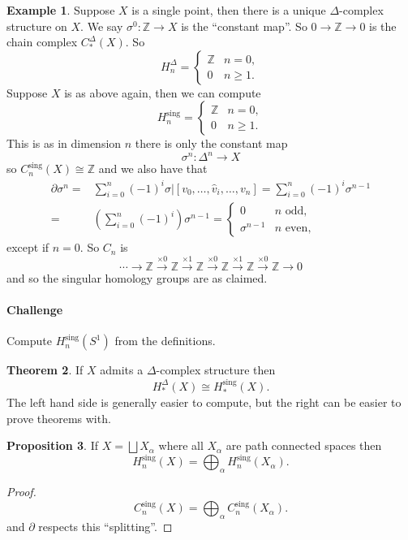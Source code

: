\documentclass[12pt]{article}
\theoremstyle{definition}
\newtheorem{thm}{Theorem}[subsection]
\newtheorem{prop}[thm]{Proposition}
\theoremstyle{definition}
\newtheorem{ex}[thm]{Example}
\newcommand{\ZZ}{\mathbb{Z}}
\newcommand{\C}{C_*}
\renewcommand{\H}{H_*}
\begin{document}
\begin{ex}
Suppose $X$ is a single point, then there is a unique $\Delta$-complex structure on $X$.
We say $\sigma^0\colon \ZZ \to X$ is the ``constant map''.
So $0 \to \ZZ \to 0$ is the chain complex $\C^\Delta(X)$.
So
\[
H_n^\Delta =\begin{cases}\ZZ &n=0,\\
0 &n\ge 1.
\end{cases} 
\]
Suppose $X$ is as above again, then we can compute
\[
H_n^\text{sing} =\begin{cases}\ZZ &n=0,\\
0 &n\ge 1.
\end{cases}
\]
This is as in dimension $n$ there is only the constant map
\[
\sigma^n \colon \Delta^n \to X
\]
so $C_n^\text{sing}(X) \cong \ZZ$ and we also have that
\begin{align*}
\partial \sigma^n =& \sum_{i=0}^{n} (-1)^i \sigma|[v_0,\ldots,\hat v_i,\ldots,v_n] = \sum_{i=0}^{n} (-1)^i \sigma^{n-1}\\
=& \left(\sum_{i=0}^{n} (-1)^i\right)\sigma^{n-1} =\begin{cases}
0 &n\text{ odd},\\
\sigma^{n-1} &n\text{ even},
\end{cases}
\end{align*}
except if $n=0$.
So $C_n$ is 
\[
\cdots\to \ZZ \xrightarrow{\times 0}\ZZ \xrightarrow{\times 1}\ZZ \xrightarrow{\times 0}\ZZ \xrightarrow{\times 1}\ZZ \xrightarrow{\times 0}\ZZ \to 0
\]
and so the singular homology groups are as claimed.
\end{ex}

\paragraph{Challenge} Compute $H_n^\text{sing}(S^1)$ from the definitions.

\begin{thm}
If $X$ admits a $\Delta$-complex structure then 
\[
\H^\Delta(X) \cong \H^\text{sing}(X).
\]
The left hand side is generally easier to compute, but the right can be easier to prove theorems with.
\end{thm}

\begin{prop}
If $X = \bigsqcup X_\alpha$ where all $X_\alpha$ are path connected spaces then 
\[
H_n^\text{sing}(X) = \bigoplus_\alpha H_n^\text{sing}(X_\alpha).
\]
\end{prop}
\begin{proof}
\[
C_n^\text{sing}(X) = \bigoplus_\alpha C_n^\text{sing}(X_\alpha).
\]
and $\partial$ respects this ``splitting''.
\end{proof}
\end{document}

